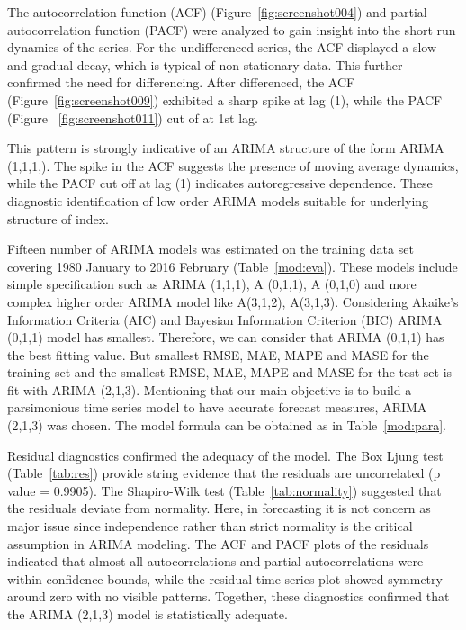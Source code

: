 \documentclass[12pt,a4paper]{report} %
\begin{document}
		The autocorrelation function (ACF) (Figure~\ref{fig:screenshot004}) and partial autocorrelation function (PACF) were analyzed to gain insight into the short run dynamics of the series. For the undifferenced series, the ACF displayed a slow and gradual decay, which is typical of non-stationary data. This further confirmed the need for differencing. After differenced, the ACF (Figure~\ref{fig:screenshot009}) exhibited a sharp spike at lag (1), while the PACF (Figure ~\ref{fig:screenshot011}) cut of at 1st lag. 
		
		This pattern is strongly indicative of an ARIMA structure of the form ARIMA (1,1,1,). The spike in the ACF suggests the presence of moving average dynamics, while the PACF cut off at lag (1) indicates autoregressive dependence. These diagnostic identification of low order ARIMA models suitable for underlying structure of index.
		
		Fifteen number of ARIMA models was estimated on the training data set covering 1980 January to 2016 February (Table~\ref{mod:eva}). These models include simple specification such as ARIMA (1,1,1), A (0,1,1), A (0,1,0) and more complex higher order ARIMA model like A(3,1,2), A(3,1,3). Considering Akaike’s Information Criteria (AIC) and Bayesian Information Criterion (BIC) ARIMA (0,1,1) model has smallest. Therefore, we can consider that ARIMA (0,1,1) has the best fitting value. But smallest RMSE, MAE, MAPE and MASE for the training set and the smallest RMSE, MAE, MAPE and MASE for the test set is fit with ARIMA (2,1,3). Mentioning that our main objective is to build a parsimonious time series model to have accurate forecast measures, ARIMA (2,1,3) was chosen. The model formula can be obtained as in Table~\ref{mod:para}.
		
		Residual diagnostics confirmed the adequacy of the model. The Box Ljung test (Table~\ref{tab:res}) provide string evidence that the residuals are uncorrelated (p value = 0.9905). The Shapiro-Wilk test (Table~\ref{tab:normality}) suggested that the residuals deviate from normality. Here, in forecasting it is not concern as major issue since independence rather than strict normality is the critical assumption in ARIMA modeling. The ACF and PACF plots of the residuals indicated that almost all autocorrelations and partial autocorrelations were within confidence bounds, while the residual time series plot showed symmetry around zero with no visible patterns. Together, these diagnostics confirmed that the ARIMA (2,1,3) model is statistically adequate.
		
\end{document}

